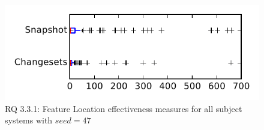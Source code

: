 
\begin{figure}
\centering
\includegraphics[height=0.4\textheight]{figures/flt_seed/rq1_tiny_47}
\caption{RQ 3.3.1: Feature Location effectiveness measures for all subject systems with $seed=47$}
\label{fig:flt_seed:rq1:tiny}
\end{figure}
